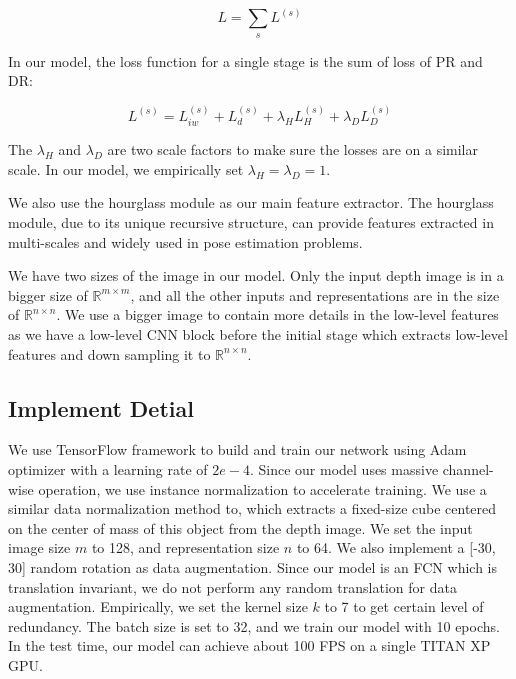 \documentclass[journal]{IEEEtran}
\begin{document}
\begin{equation}
  L=\sum_{s} L^{(s)}
\end{equation}

In our model, the loss function for a single stage is the sum of loss of PR and DR:

\begin{equation}
  L^{(s)}=L_{i w}^{(s)}+L_{d}^{(s)}+\lambda_{H} L_{H}^{(s)}+\lambda_{D} L_{D}^{(s)}
\end{equation}

The $\lambda_{H}$ and $\lambda_{D}$ are two scale factors to make sure the losses are on a similar scale. 
In our model, we empirically set $\lambda_{H} = \lambda_{D} = 1$.

We also use the hourglass module\cite{newell2016stacked} as our main feature extractor. 
The hourglass module, due to its unique recursive structure, can provide features extracted in multi-scales and 
widely used in pose estimation problems. 

We have two sizes of the image in our model. 
Only the input depth image is in a bigger size of $\mathbb{R}^{m \times m}$, 
and all the other inputs and representations are in the size of $\mathbb{R}^{n \times n}$. 
We use a bigger image to contain more details in the low-level features as we have a low-level CNN block before the initial stage 
which extracts low-level features and down sampling it to $\mathbb{R}^{n \times n}$.

\subsection{Implement Detial}

We use TensorFlow framework to build and train our network using Adam optimizer with a learning rate of $2e-4$. 
Since our model uses massive channel-wise operation, we use instance normalization\cite{ulyanov2016instance} to accelerate training. 
We use a similar data normalization method to\cite{oberweger2017deepprior}, 
which extracts a fixed-size cube centered on the center of mass of this object from the depth image. 
We set the input image size $m$ to 128, and representation size $n$ to 64. 
We also implement a [-30, 30] random rotation as data augmentation. 
Since our model is an FCN which is translation invariant, we do not perform any random translation for data augmentation. 
Empirically, we set the kernel size $k$ to 7 to get certain level of redundancy. 
The batch size is set to 32, and we train our model with 10 epochs. 
In the test time, our model can achieve about 100 FPS on a single TITAN XP GPU.
\end{document}
